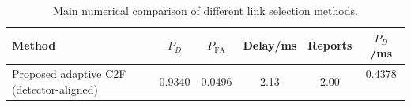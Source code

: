 \begin{table}[t]
    \centering
    \caption{Main numerical comparison of different link selection methods.}
    \label{tab:main_summary}
    \begin{tabular}{l c c c c c}
        \hline
        Method & $P_D$ & $P_{\mathrm{FA}}$ & Delay/ms & Reports & $P_D$/ms \\
        \hline
        Proposed adaptive C2F (detector-aligned) & 0.9340 & 0.0496 & 2.13 & 2.00 & 0.4378 \
        \hline
    \end{tabular}
\end{table}
